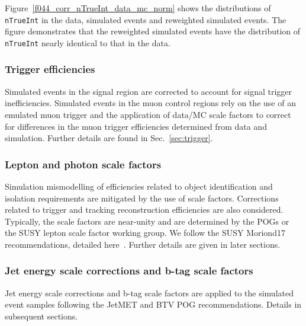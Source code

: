 Figure~\ref{f044_corr_nTrueInt_data_mc_norm} shows the distributions
of \verb!nTrueInt! in the data, simulated events and reweighted
simulated events. The figure demonstrates that the reweighted
simulated events have the distribution of \verb!nTrueInt! nearly
identical to that in the data. 

\subsubsection{Trigger efficiencies}
\label{sec:trigger-sf}

Simulated events in the signal region are corrected to account for
signal trigger inefficiencies. Simulated events in the muon control
regions rely on the use of an emulated muon trigger and the
application of data/MC scale factors to correct for differences in the
muon trigger efficiencies determined from data and simulation. Further
details are found in Sec.~\ref{sec:trigger}.

\subsubsection{Lepton and photon scale factors}

Simulation mismodelling of efficiencies related to object
identification and isolation requirements are mitigated by the use of
scale factors. Corrections related to trigger and tracking
reconstruction efficiencies are also considered. Typically, the scale
factors are near-unity and are determined by the POGs or the SUSY
lepton scale factor working group. We follow the SUSY Moriond17
recommendations, detailed here~\cite{susymoriond}. Further details are
given in later sections.

\subsubsection{Jet energy scale corrections and b-tag scale factors}
\label{sec:jecs-and-btag-sf}

Jet energy scale corrections and b-tag scale factors are applied to
the simulated event samples following the JetMET and BTV POG
recommendations. Details in subsequent sections. 

